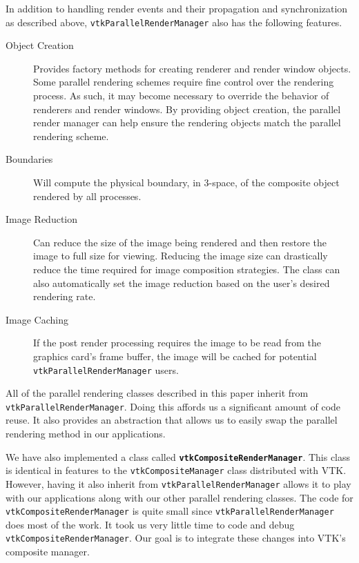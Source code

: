 \documentclass{acmsiggraph}
\newcommand{\cidentifier}[1]{\texttt{#1}}
\newcommand{\keyterm}[1]{\textbf{#1}}
\begin{document}
  In addition to handling render events and their propagation and
  synchronization as described above,
  \cidentifier{vtk\-Parallel\-Render\-Manager} also has the following
  features.
  \begin{description}
    \item [Object Creation] Provides factory methods for creating renderer
      and render window objects.  Some parallel rendering schemes require
      fine control over the rendering process.  As such, it may become
      necessary to override the behavior of renderers and render windows.
      By providing object creation, the parallel render manager can help
      ensure the rendering objects match the parallel rendering scheme.
    \item [Boundaries] Will compute the physical boundary, in 3-space, of
      the composite object rendered by all processes.
    \item [Image Reduction] Can reduce the size of the image being rendered
      and then restore the image to full size for viewing.  Reducing the
      image size can drastically reduce the time required for image
      composition strategies.  The class can also automatically set the
      image reduction based on the user's desired rendering rate.
    \item [Image Caching] If the post render processing requires the image
      to be read from the graphics card's frame buffer, the image will be
      cached for potential \cidentifier{vtk\-Parallel\-Render\-Manager}
      users.
  \end{description}

  All of the parallel rendering classes described in this paper inherit
  from \cidentifier{vtk\-Parallel\-Render\-Manager}.  Doing this affords us
  a significant amount of code reuse.  It also provides an abstraction that
  allows us to easily swap the parallel rendering method in our
  applications.

  We have also implemented a class called
  \keyterm{\cidentifier{vtk\-Composite\-Render\-Manager}}.  This class is
  identical in features to the \cidentifier{vtk\-Composite\-Manager} class
  distributed with VTK.  However, having it also inherit from
  \cidentifier{vtk\-Parallel\-Render\-Manager} allows it to play with our
  applications along with our other parallel rendering classes.  The code
  for \cidentifier{vtk\-Composite\-Render\-Manager} is quite small since
  \cidentifier{vtk\-Parallel\-Render\-Manager} does most of the work.  It
  took us very little time to code and debug
  \cidentifier{vtk\-Composite\-Render\-Manager}.  Our goal is to integrate
  these changes into VTK's composite manager.
\end{document}
